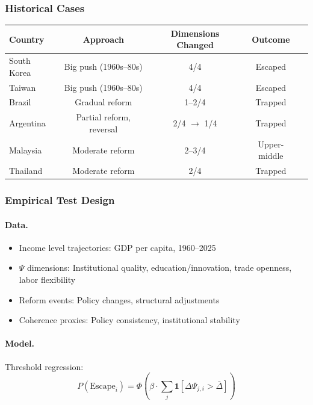 \subsubsection{Historical Cases}

\begin{center}
\renewcommand{\arraystretch}{1.2}
\begin{tabular}{lcccc}
\hline
\textbf{Country} & \textbf{Approach} & \textbf{Dimensions Changed} & \textbf{Outcome} \\
\hline
South Korea & Big push (1960s--80s) & 4/4 & Escaped \\
Taiwan & Big push (1960s--80s) & 4/4 & Escaped \\
Brazil & Gradual reform & 1--2/4 & Trapped \\
Argentina & Partial reform, reversal & 2/4 $\to$ 1/4 & Trapped \\
Malaysia & Moderate reform & 2--3/4 & Upper-middle \\
Thailand & Moderate reform & 2/4 & Trapped \\
\hline
\end{tabular}
\end{center}

\subsubsection{Empirical Test Design}

\paragraph{Data.}
\begin{itemize}
  \item Income level trajectories: GDP per capita, 1960--2025
  \item $\Psi$ dimensions: Institutional quality, education/innovation, trade openness, labor flexibility
  \item Reform events: Policy changes, structural adjustments
  \item Coherence proxies: Policy consistency, institutional stability
\end{itemize}

\paragraph{Model.}
Threshold regression:
\begin{equation}
P(\text{Escape}_i) = \Phi\left(\beta \cdot \sum_j \mathbf{1}[\Delta \Psi_{j,i} > \bar{\Delta}]\right)
\end{equation}

